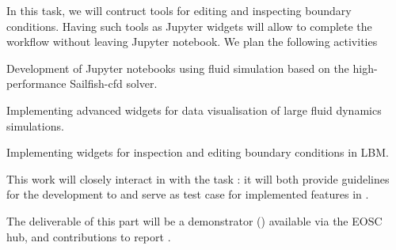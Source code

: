 \begin{task}[
  title=Demonstrator: Visualisation and control of fluid dynamics in Jupyter notebook,
  id=application-gpu,
  lead=SIL,
  PM=12,
  wphases={4-36},
  partners={EGI}
]


In this task, we will contruct tools for editing and inspecting
boundary conditions. Having such tools as Jupyter widgets will allow
to complete the workflow without leaving Jupyter notebook. We plan the
following activities
\begin{compactitem}
\item Development of Jupyter notebooks using fluid
  simulation based on the high-performance Sailfish-cfd solver.
\item Implementing advanced widgets for data visualisation of large
  fluid dynamics simulations.
\item Implementing widgets for inspection and editing boundary
  conditions in LBM.
\end{compactitem}

This work will closely interact in with the task
: it will both provide guidelines
for the development to  and serve
as test case for implemented features in
.

The deliverable of this part will be a demonstrator
() available via the EOSC hub, and
contributions to report .

\end{task}
